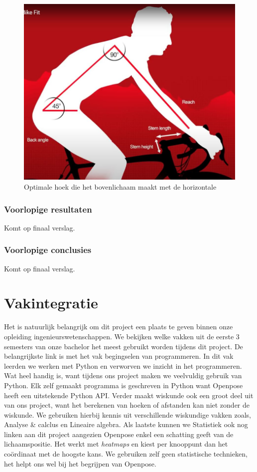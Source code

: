 \documentclass[a4paper,twoside,kulak]{kulakreport}
\begin{document}
\begin{figure}[H]
	\centering
	\includegraphics[width=\textwidth]{bikefit_romp}
	\caption{Optimale hoek die het bovenlichaam maakt met de horizontale}
	\label{fig:bikefit_romp}
\end{figure}

\subsection{Voorlopige resultaten}
Komt op finaal verslag.

\subsection{Voorlopige conclusies}
Komt op finaal verslag.

\chapter{Vakintegratie}
Het is natuurlijk belangrijk om dit project een plaats te geven binnen onze opleiding ingenieurswetenschappen. We bekijken welke vakken uit de eerste 3 semesters van onze bachelor het meest gebruikt worden tijdens dit project. De belangrijkste link is met het vak begingselen van programmeren. In dit vak leerden we werken met Python en verworven we inzicht in het programmeren. Wat heel handig is, want tijdens ons project maken we veelvuldig gebruik van Python. Elk zelf gemaakt programma is geschreven in Python want Openpose heeft een uitstekende Python API. Verder maakt wiskunde ook een groot deel uit van ons project, want het berekenen van hoeken of afstanden kan niet zonder de wiskunde. We gebruiken hierbij kennis uit verschillende wiskundige vakken zoals, Analyse \& calclus en Lineaire algebra. Als laatste kunnen we Statistiek ook nog linken aan dit project aangezien Openpose enkel een schatting geeft van de lichaamspositie. Het werkt met \textit{heatmaps} en kiest per knooppunt dan het coördinaat met de hoogste kans. We gebruiken zelf geen statistische technieken, het helpt ons wel bij het begrijpen van Openpose.
\end{document}
